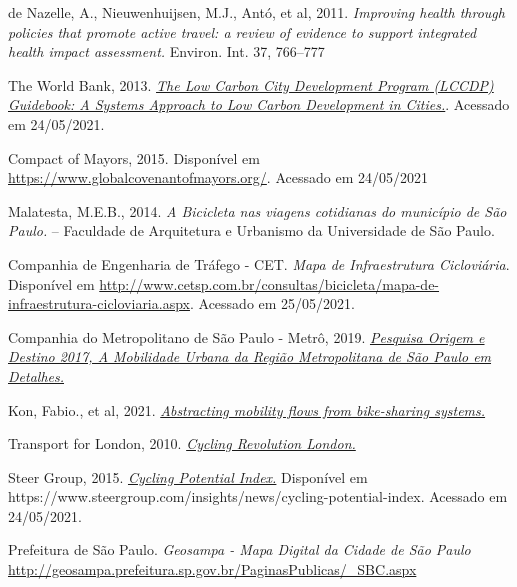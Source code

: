 \documentclass[a4paper]{article}
\begin{document}
\begin{thebibliography}{9}
de Nazelle, A., Nieuwenhuijsen, M.J., Antó, et al, 2011. \textit{Improving health through policies that promote active travel: a review of evidence to support integrated health impact assessment.} Environ. Int. 37, 766–777

The World Bank, 2013. \href{https://documents.worldbank.org/en/publication/documents-reports/documentdetail/390491468338496549/the-low-carbon-city-development-program-lccdp-guidebook-a-systems-approach-to-low-carbon-development-in-cities}{\textit{The Low Carbon City Development Program (LCCDP) Guidebook: A Systems Approach to Low Carbon Development in Cities.}}. Acessado em 24/05/2021.

Compact of Mayors, 2015. Disponível em \href{https://www.globalcovenantofmayors.org/}{https://www.globalcovenantofmayors.org/}. Acessado em 24/05/2021

Malatesta, M.E.B., 2014. \textit{A Bicicleta nas viagens cotidianas do município de São Paulo.} – Faculdade de Arquitetura e Urbanismo da Universidade de São Paulo.

Companhia de Engenharia de Tráfego - CET. \textit{Mapa de Infraestrutura Cicloviária}. Disponível em \href{http://www.cetsp.com.br/consultas/bicicleta/mapa-de-infraestrutura-cicloviaria.aspx}{http://www.cetsp.com.br/consultas/bicicleta/mapa-de-infraestrutura-cicloviaria.aspx}. Acessado em 25/05/2021.

Companhia do Metropolitano de São Paulo - Metrô, 2019. \href{https://transparencia.metrosp.com.br/dataset/pesquisa-origem-e-destino/resource/b3d93105-f91e-43c6-b4c0-8d9c617a27fc}{\textit{Pesquisa Origem e Destino 2017, A Mobilidade Urbana da Região Metropolitana de São Paulo em Detalhes.}}

Kon, Fabio., et al, 2021. \href{https://link.springer.com/article/10.1007/s12469-020-00259-5}{\textit{Abstracting mobility flows from bike-sharing systems.}} 

Transport for London, 2010. \href{https://www.london.gov.uk/sites/default/files/cycling-revolution-london.pdf}{\textit{Cycling Revolution London.}}

Steer Group, 2015. \href{https://www.steergroup.com/insights/news/cycling-potential-index}{\textit{Cycling Potential Index.}} Disponível em https://www.steergroup.com/insights/news/cycling-potential-index. Acessado em 24/05/2021. 

Prefeitura de São Paulo. \textit{Geosampa - Mapa Digital da Cidade de São Paulo} \href{http://geosampa.prefeitura.sp.gov.br/PaginasPublicas/_SBC.aspx}{http://geosampa.prefeitura.sp.gov.br/PaginasPublicas/\_SBC.aspx}

\end{thebibliography}
\end{document}
